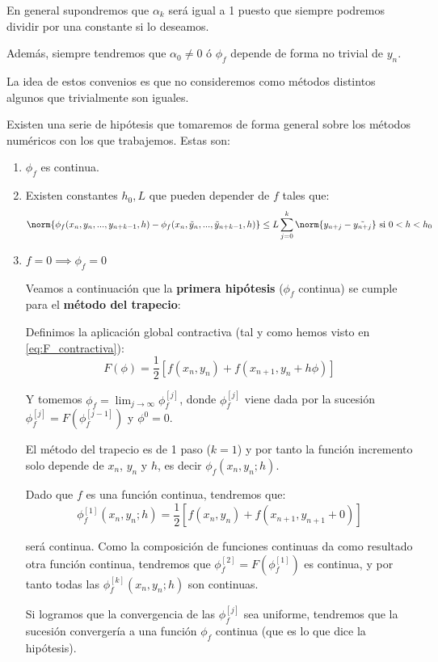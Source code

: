 \documentclass{apuntes}
\begin{document}
En general supondremos que  $α_k$ será igual a 1 puesto que siempre podremos dividir por una constante si lo deseamos.

Además, siempre tendremos que $α_0 \neq 0$ ó $\phi_f$ depende de forma no trivial de $y_n$.

La idea de estos convenios es que no consideremos como métodos distintos algunos que trivialmente son iguales.

\begin{prop}
Existen una serie de hipótesis que tomaremos de forma general sobre los métodos numéricos con los que trabajemos. Estas son:

\begin{enumerate}
\item $\phi_f$ es continua.

\item Existen constantes $h_0,L$ que pueden depender de $f$ tales que:
\[\norm{\phi_f(x_n,y_n,...,y_{n+k-1},h) - \phi_f(x_n,\tilde{y}_n,...,\tilde{y}_{n+k-1},h)}\leq L \sum_{j=0}^k \norm{y_{n+j}-\tilde{y_{n+j}}} \text{ si } 0 < h < h_0\]

\item $f= 0 \implies \phi_f=0$


\begin{example}
	Veamos a continuación que la \textbf{primera hipótesis} ($\phi_f$ continua) se cumple para el \textbf{método del trapecio}:

	Definimos la aplicación global contractiva (tal y como hemos visto en \ref{eq:F_contractiva}):
	\[F(\phi) = \frac{1}{2} \left[ f(x_n,y_n) + f(x_{n+1}, y_n+h\phi) \right]\]

	Y tomemos $\phi_f = \lim_{j\to∞} \phi_f^{[j]}$, donde $\phi_f^{[j]}$ viene dada por la sucesión $\phi_f^{[j]} = F\left(\phi_f^{[j-1]}\right)$ y $\phi^0 = 0$.

	\obs El método del trapecio es de 1 paso ($k=1$) y por tanto la función incremento solo depende de $x_n$, $y_n$ y $h$, es decir $\phi_f(x_n,y_n;h)$.

	Dado que $f$ es una función continua, tendremos que:
	\[\phi_f^{[1]}(x_n,y_n;h) = \frac{1}{2} \left[ f(x_n,y_n) + f(x_{n+1}, y_{n+1} + 0) \right]\]

	será continua. Como la composición de funciones continuas da como resultado otra función continua, tendremos que $\phi_f^{[2]}=F\left( \phi_f^{[1]} \right)$ es continua, y por tanto todas las $\phi_f^{[k]}(x_n,y_n;h)$ son continuas.

	Si logramos que la convergencia de las $\phi_f^{[j]}$ sea uniforme, tendremos que la sucesión convergería a una función $\phi_f$ continua (que es lo que dice la hipótesis).


\end{example}
\end{enumerate}
\end{prop}
\end{document}
